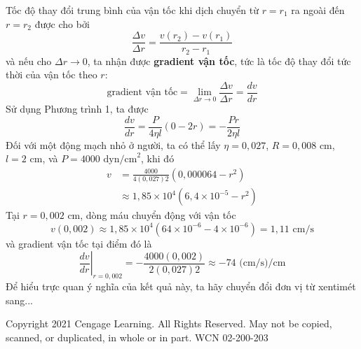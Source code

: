\noindent
Tốc độ thay đổi trung bình của vận tốc khi dịch chuyển từ $r = r_1$ ra ngoài đến $r = r_2$ được cho bởi
\[
\frac{\Delta v}{\Delta r} = \frac{v(r_2) - v(r_1)}{r_2 - r_1}
\]
và nếu cho $\Delta r \to 0$, ta nhận được \textbf{gradient vận tốc}, tức là tốc độ thay đổi tức thời của vận tốc theo $r$:
\[
\text{gradient vận tốc} = \lim_{\Delta r \to 0} \frac{\Delta v}{\Delta r} = \frac{dv}{dr}
\]
Sử dụng Phương trình 1, ta được
\[
\frac{dv}{dr} = \frac{P}{4\eta l}(0 - 2r) = -\frac{Pr}{2\eta l}
\]
Đối với một động mạch nhỏ ở người, ta có thể lấy $\eta = 0{,}027$, $R = 0{,}008\text{ cm}$, $l = 2\text{ cm}$, và $P = 4000\text{ dyn/cm}^2$, khi đó
\begin{align*}
v &= \frac{4000}{4(0{,}027)2}(0{,}000064 - r^2)\\[4pt]
&\approx 1{,}85 \times 10^4 (6{,}4 \times 10^{-5} - r^2)
\end{align*}
Tại $r = 0{,}002\text{ cm}$, dòng máu chuyển động với vận tốc
\[
v(0{,}002) \approx 1{,}85 \times 10^4 (64 \times 10^{-6} - 4 \times 10^{-6}) = 1{,}11\text{ cm/s}
\]
và gradient vận tốc tại điểm đó là
\[
\left.\frac{dv}{dr}\right|_{r=0{,}002} = -\frac{4000(0{,}002)}{2(0{,}027)2} \approx -74\text{ (cm/s)/cm}
\]
Để hiểu trực quan ý nghĩa của kết quả này, ta hãy chuyển đổi đơn vị từ xentimét sang...

\vfill
\noindent
{\tiny\color{gray}Copyright 2021 Cengage Learning. All Rights Reserved. May not be copied, scanned, or duplicated, in whole or in part. WCN 02-200-203}
